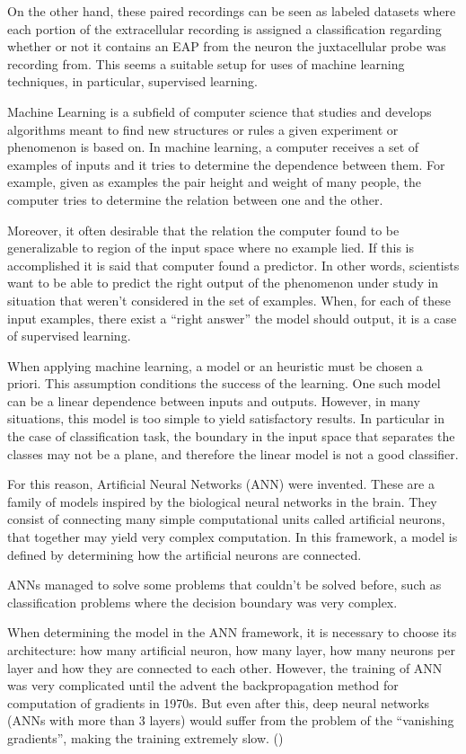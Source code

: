 On the other hand, these paired recordings can be seen as labeled datasets where each portion of the extracellular recording is assigned a classification regarding whether or not it contains an EAP from the neuron the juxtacellular probe was recording from. This seems a suitable setup for uses of machine learning techniques, in particular, supervised learning.

Machine Learning is a subfield of computer science that studies and develops algorithms meant to find new structures or rules a given experiment or phenomenon is based on. In machine learning, a computer receives a set of examples of inputs and it tries to determine the dependence between them. For example, given as examples the pair height and weight of many people, the computer tries to determine the relation between one and the other. 
 
Moreover, it often desirable that the relation the computer found to be generalizable to region of the input space where no example lied. If this is accomplished it is said that computer found a predictor. In other words, scientists want to be able to predict the right output of the phenomenon under study in situation that weren't considered in the set of examples. 
When, for each of these input examples, there exist a “right answer” the model should output, it is a case of supervised learning.

When applying machine learning, a model or an heuristic must be chosen a priori. This assumption conditions the success of the learning. One such model can be a linear dependence between inputs and outputs. However, in many situations, this model is too simple to yield satisfactory results. In particular in the case of classification task, the boundary in the input space that separates the  classes may not be a plane, and therefore the linear model is not a good classifier.

For this reason, Artificial Neural Networks (ANN) were invented. These are a family of models inspired by the biological neural networks in the brain. They consist of connecting many simple computational units called artificial neurons, that together may yield very complex computation. In this framework, a model is defined by determining how the artificial neurons are connected. 

ANNs managed to solve some problems that couldn't be solved before, such as classification problems where the decision boundary was very complex.

When determining the model in the ANN framework, it is necessary to choose its architecture: how many artificial neuron, how many layer, how many neurons per layer and how they are connected to each other.  However, the training of ANN was very complicated until the advent the backpropagation method for computation of gradients in 1970s.  But even after this, deep neural networks (ANNs with more than 3 layers) would suffer from the problem of the “vanishing gradients”, making the training extremely slow. (\cite{hochreiter2001gradient})

